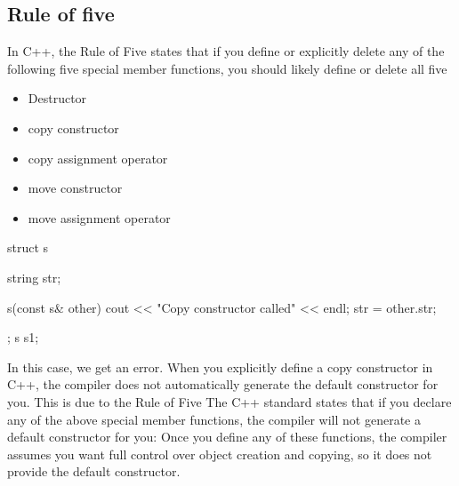 \documentclass{report}
\begin{document}
    \subsection{Rule of five}
    \bigbreak \noindent 
    In C++, the Rule of Five states that if you define or explicitly delete any of the following five special member functions, you should likely define or delete all five
    \begin{itemize}
        \item Destructor
        \item copy constructor
        \item copy assignment operator
        \item move constructor 
        \item move assignment operator
    \end{itemize}
    \bigbreak \noindent 
    \begin{cppcode}
        struct s {
            string str{};

            s(const s& other) {
                cout << "Copy constructor called" << endl;
                str = other.str;
            }
        };
        s s1;
    \end{cppcode}
    \bigbreak \noindent 
    In this case, we get an error. When you explicitly define a copy constructor in C++, the compiler does not automatically generate the default constructor for you. This is due to the Rule of Five
    \bigbreak \noindent 
    The C++ standard states that if you declare any of the above special member functions, the compiler will not generate a default constructor for you:
    \bigbreak \noindent 
    Once you define any of these functions, the compiler assumes you want full control over object creation and copying, so it does not provide the default constructor.

    \bigbreak \noindent 
\end{document}
